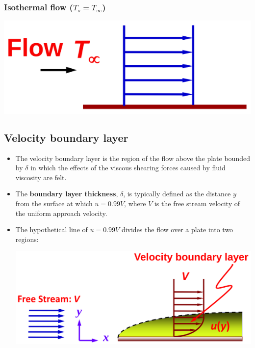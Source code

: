 \documentclass[11pt]{article}
\begin{document}
\subsubsection{Isothermal flow (\(T_s = T_{\infty}\))}
\label{sec:org547aa4d}
\begin{center}
\includegraphics[width=.9\linewidth]{./images/temperature-profile-isothermal-flow.png}
\end{center}
\subsection{Velocity boundary layer}
\label{sec:org9e3a9a3}
\begin{itemize}
\item The velocity boundary layer is the region of the flow above the plate bounded by \(\delta\) in which the effects of the viscous shearing forces caused by fluid viscosity are felt.
\item The \textbf{boundary layer thickness}, \(\delta\), is typically defined as the distance \(y\) from the surface at which \(u = 0.99V\), where \(V\) is the free stream velocity of the uniform approach velocity.
\item The hypothetical line of \(u = 0.99V\) divides the flow over a plate into two regions:
\begin{center}
\includegraphics[width=.9\linewidth]{./images/velocity-boundary-layer-diagram.png}
\end{center}
\end{itemize}
\end{document}

